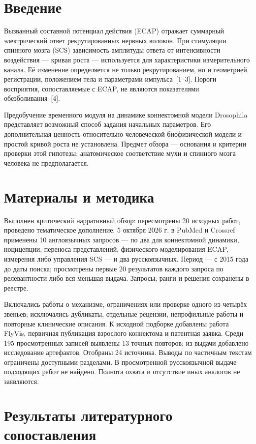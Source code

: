 \documentclass[12pt,a4paper]{article}
\begin{document}
\section*{Введение}
Вызванный составной потенциал действия (ECAP) отражает суммарный электрический ответ рекрутированных нервных волокон. При стимуляции спинного мозга (SCS) зависимость амплитуды ответа от интенсивности воздействия — кривая роста — используется для характеристики измерительного канала. Её изменение определяется не только рекрутированием, но и геометрией регистрации, положением тела и параметрами импульса~\mbox{[1–3]}. Пороги восприятия, сопоставляемые с ECAP, не являются показателями обезболивания~\mbox{[4]}.\par
Предобучение временного модуля на динамике коннектомной модели Drosophila представляет возможный способ задания начальных параметров. Его дополнительная ценность относительно человеческой биофизической модели и простой кривой роста не установлена. Предмет обзора — основания и критерии проверки этой гипотезы; анатомическое соответствие мухи и спинного мозга человека не предполагается.\par
\section*{Материалы и методика}
Выполнен критический нарративный обзор: пересмотрены 20 исходных работ, проведено тематическое дополнение. 5 октября 2026 г. в PubMed и Crossref применены 10 англоязычных запросов — по два для коннектомной динамики, ноцицепции, переноса представлений, физического моделирования ECAP, измерения либо управления SCS — и два русскоязычных. Период — с 2015 года до даты поиска; просмотрены первые 20 результатов каждого запроса по релевантности либо вся меньшая выдача. Запросы, ранги и решения сохранены в реестре.\par
Включались работы о механизме, ограничениях или проверке одного из четырёх звеньев; исключались дубликаты, отдельные рецензии, непрофильные работы и повторные клинические описания. К исходной подборке добавлены работа FlyVis, первичная публикация взрослого коннектома и патентная заявка. Среди 195 просмотренных записей выявлены 13 точных повторов; из выдачи добавлено исследование артефактов. Отобраны 24 источника. Выводы по частичным текстам ограничены доступными разделами. В просмотренной русскоязычной выдаче подходящих работ не найдено. Полнота охвата и отсутствие иных аналогов не заявляются.\par
\section*{Результаты литературного сопоставления}
\end{document}
